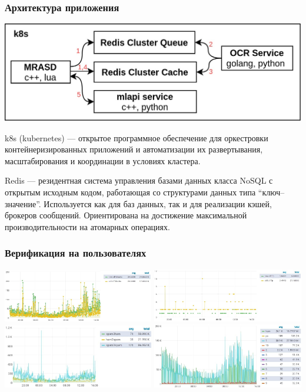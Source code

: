 \documentclass[compress,professionalfont]{beamer}
\begin{document}
\begin{frame}
\frametitle{Архитектура приложения}

\begin{center}
\includegraphics[width=.8\textwidth]{architecture.jpg}
\end{center}

k8s (kubernetes) --- открытое программное обеспечение для оркестровки контейнеризированных приложений и автоматизации их развертывания, масштабирования и координации в условиях кластера.

Redis --- резидентная система управления базами данных класса NoSQL с открытым исходным кодом, работающая со структурами данных типа ``ключ--значение''. Используется как для баз данных, так и для реализации кэшей, брокеров сообщений. Ориентирована на достижение максимальной производительности на атомарных операциях.

\end{frame}

\begin{frame}
\frametitle{Верификация на пользователях}

\begin{center}
\includegraphics[width=0.495\textwidth]{old_vs_new_ps.jpg}
\includegraphics[width=0.495\textwidth]{old_vs_new_fp.jpg}
\includegraphics[width=0.495\textwidth]{old_vs_new_status.jpg}
\includegraphics[width=0.495\textwidth]{dist_prob.jpg}
\end{center}

\end{frame}
\end{document}
